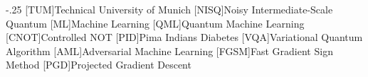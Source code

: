 \documentclass[headsepline,footsepline,footinclude=false,oneside,fontsize=11pt,paper=a4,listof=totoc,bibliography=totoc]{scrbook} %
\begin{document}


\frontmatter{}





\tableofcontents{}

\mainmatter{}









\appendix



\begin{acronym}
	\itemsep-.25\baselineskip{}
	[TUM]{Technical University of Munich}
	[NISQ]{Noisy Intermediate-Scale Quantum}
	[ML]{Machine Learning}
	[QML]{Quantum Machine Learning}
	[CNOT]{Controlled NOT}
	[PID]{Pima Indians Diabetes}
	[VQA]{Variational Quantum Algorithm}
	[AML]{Adversarial Machine Learning}
	[FGSM]{Fast Gradient Sign Method}
	[PGD]{Projected Gradient Descent}
\end{acronym}

\listoffigures{}
\listoftables{}
\printbibliography{}
\end{document}
